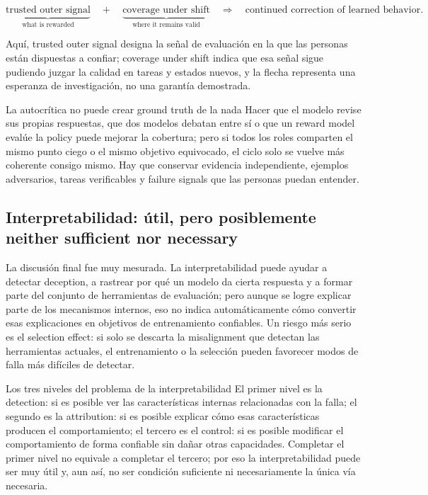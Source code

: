 \[
\underbrace{\text{trusted outer signal}}_{\text{what is rewarded}}
\quad+\quad
\underbrace{\text{coverage under shift}}_{\text{where it remains valid}}
\quad\Longrightarrow\quad
\text{continued correction of learned behavior}.
\]

Aquí, trusted outer signal designa la señal de evaluación en la que las personas están dispuestas a confiar; coverage under shift indica que esa señal sigue pudiendo juzgar la calidad en tareas y estados nuevos, y la flecha representa una esperanza de investigación, no una garantía demostrada.


\begin{warningbox}{La autocrítica no puede crear ground truth de la nada}
Hacer que el modelo revise sus propias respuestas, que dos modelos debatan entre sí o que un reward model evalúe la policy puede mejorar la cobertura; pero si todos los roles comparten el mismo punto ciego o el mismo objetivo equivocado, el ciclo solo se vuelve más coherente consigo mismo. Hay que conservar evidencia independiente, ejemplos adversarios, tareas verificables y failure signals que las personas puedan entender.
\end{warningbox}

\subsection{Interpretabilidad: útil, pero posiblemente neither sufficient nor necessary}

La discusión final fue muy mesurada. La interpretabilidad puede ayudar a detectar deception, a rastrear por qué un modelo da cierta respuesta y a formar parte del conjunto de herramientas de evaluación; pero aunque se logre explicar parte de los mecanismos internos, eso no indica automáticamente cómo convertir esas explicaciones en objetivos de entrenamiento confiables. Un riesgo más serio es el selection effect: si solo se descarta la misalignment que detectan las herramientas actuales, el entrenamiento o la selección pueden favorecer modos de falla más difíciles de detectar.

\begin{importantbox}{Los tres niveles del problema de la interpretabilidad}
El primer nivel es la detection: si es posible ver las características internas relacionadas con la falla; el segundo es la attribution: si es posible explicar cómo esas características producen el comportamiento; el tercero es el control: si es posible modificar el comportamiento de forma confiable sin dañar otras capacidades. Completar el primer nivel no equivale a completar el tercero; por eso la interpretabilidad puede ser muy útil y, aun así, no ser condición suficiente ni necesariamente la única vía necesaria.
\end{importantbox}

